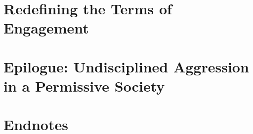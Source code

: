\documentclass{article}
\numberwithin{equation}{section}
\begin{document}
\section{Redefining the Terms of Engagement}


\section{Epilogue: Undisciplined Aggression in a Permissive Society}


\section{Endnotes}


\printbibliography[heading=bibintoc]
	
\end{document}
